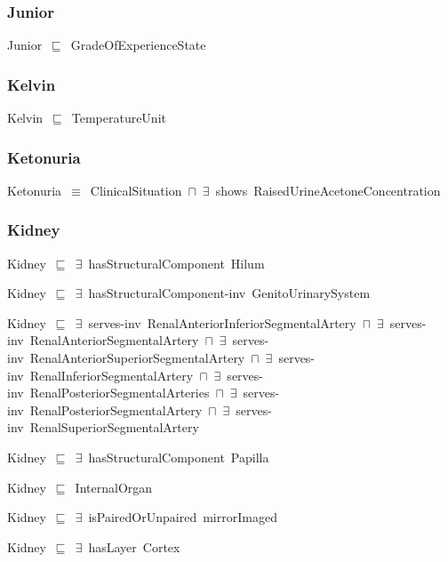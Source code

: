 \documentclass{article}
\begin{document}
\subsubsection*{Junior}

Junior~\ensuremath{\sqsubseteq}~GradeOfExperienceState~

\subsubsection*{Kelvin}

Kelvin~\ensuremath{\sqsubseteq}~TemperatureUnit~

\subsubsection*{Ketonuria}

Ketonuria~\ensuremath{\equiv}~ClinicalSituation~\ensuremath{\sqcap}~\ensuremath{\exists}~shows~RaisedUrineAcetoneConcentration

\subsubsection*{Kidney}

Kidney~\ensuremath{\sqsubseteq}~\ensuremath{\exists}~hasStructuralComponent~Hilum~

Kidney~\ensuremath{\sqsubseteq}~\ensuremath{\exists}~hasStructuralComponent-inv~GenitoUrinarySystem~

Kidney~\ensuremath{\sqsubseteq}~\ensuremath{\exists}~serves-inv~RenalAnteriorInferiorSegmentalArtery~\ensuremath{\sqcap}~\ensuremath{\exists}~serves-inv~RenalAnteriorSegmentalArtery~\ensuremath{\sqcap}~\ensuremath{\exists}~serves-inv~RenalAnteriorSuperiorSegmentalArtery~\ensuremath{\sqcap}~\ensuremath{\exists}~serves-inv~RenalInferiorSegmentalArtery~\ensuremath{\sqcap}~\ensuremath{\exists}~serves-inv~RenalPosteriorSegmentalArteries~\ensuremath{\sqcap}~\ensuremath{\exists}~serves-inv~RenalPosteriorSegmentalArtery~\ensuremath{\sqcap}~\ensuremath{\exists}~serves-inv~RenalSuperiorSegmentalArtery~

Kidney~\ensuremath{\sqsubseteq}~\ensuremath{\exists}~hasStructuralComponent~Papilla~

Kidney~\ensuremath{\sqsubseteq}~InternalOrgan~

Kidney~\ensuremath{\sqsubseteq}~\ensuremath{\exists}~isPairedOrUnpaired~mirrorImaged~

Kidney~\ensuremath{\sqsubseteq}~\ensuremath{\exists}~hasLayer~Cortex~
\end{document}
